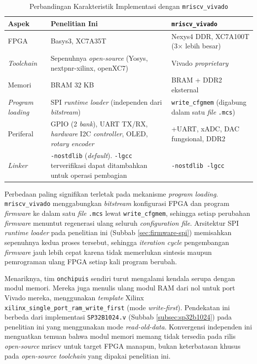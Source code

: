 \begin{table}[h]
	\centering
	\begin{tabular}{|l|p{5cm}|p{5cm}|}
		\hline
		\textbf{Aspek} & \textbf{Penelitian Ini} & \textbf{\texttt{mriscv\_vivado}} \\
		\hline
		FPGA & Basys3, XC7A35T & Nexys4 DDR, XC7A100T (3$\times$ lebih besar) \\ \hline
		\textit{Toolchain} & Sepenuhnya \textit{open-source} (Yosys, nextpnr-xilinx, openXC7) & Vivado \textit{proprietary} \\ \hline
		Memori & BRAM 32 KB & BRAM + DDR2 eksternal \\ \hline
		\textit{Program loading} & SPI \textit{runtime loader} (independen dari \textit{bitstream}) & \texttt{write\_cfgmem} (digabung dalam satu \textit{file} \texttt{.mcs}) \\ \hline
		Periferal & GPIO (2 \textit{bank}), UART TX/RX, \textit{hardware} I2C \textit{controller}, OLED, \textit{rotary encoder} & +UART, xADC, DAC fungsional, DDR2 \\ \hline
		\textit{Linker} & \texttt{-nostdlib} (\textit{default}). \texttt{-lgcc} terverifikasi dapat ditambahkan untuk operasi pembagian & \texttt{-nostdlib -lgcc} \\ \hline
	\end{tabular}
	\vspace{0.5em}
	\caption{Perbandingan Karakteristik Implementasi dengan \texttt{mriscv\_vivado}}
	\label{Tab: Perbandingan mriscv_vivado}
\end{table}

Perbedaan paling signifikan terletak pada mekanisme \textit{program loading}. \texttt{mriscv\_vivado} menggabungkan \textit{bitstream} konfigurasi FPGA dan program \textit{firmware} ke dalam satu \textit{file} \texttt{.mcs} lewat \texttt{write\_cfgmem}, sehingga setiap perubahan \textit{firmware} menuntut regenerasi ulang seluruh \textit{configuration file}. Arsitektur SPI \textit{runtime loader} pada penelitian ini (Subbab \ref{sec:firmware-spi}) memisahkan sepenuhnya kedua proses tersebut, sehingga \textit{iteration cycle} pengembangan \textit{firmware} jauh lebih cepat karena tidak memerlukan sintesis maupun pemrograman ulang FPGA setiap kali program berubah.

Menariknya, tim \texttt{onchipuis} sendiri turut mengalami kendala serupa dengan modul memori. Mereka juga menulis ulang modul RAM dari nol untuk port Vivado mereka, menggunakan \textit{template} Xilinx \texttt{xilinx\_single\_port\_ram\_write\_first} (mode \textit{write-first}). Pendekatan ini berbeda dari implementasi \texttt{SP32B1024.v} (Subbab \ref{subsec:sp32b1024}) pada penelitian ini yang menggunakan mode \textit{read-old-data}. Konvergensi independen ini menguatkan temuan bahwa modul memori memang tidak tersedia pada rilis \textit{open-source} mriscv untuk target FPGA manapun, bukan keterbatasan khusus pada \textit{open-source toolchain} yang dipakai penelitian ini.
